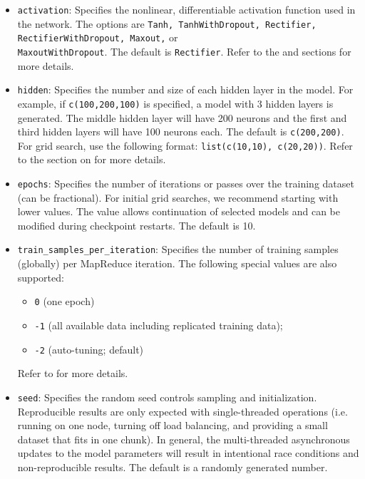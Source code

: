 {{{\begin{itemize}
\item \texttt{activation}: Specifies the nonlinear, differentiable activation function used in the network. The options are \texttt{Tanh, TanhWithDropout, Rectifier, RectifierWithDropout, Maxout,} or \\\texttt{MaxoutWithDropout}. The default is \texttt{Rectifier}. Refer to the {\textbf{}} and {\textbf{}} sections for more details.

\item \texttt{hidden}: Specifies the number and size of each hidden layer in the model. For example, if \texttt{c(100,200,100)} is specified, a model with 3 hidden layers is generated. The middle hidden layer will have 200 neurons and the first and third hidden layers will have 100 neurons each. The default is \texttt{c(200,200)}. For grid search, use the following format: \texttt{list(c(10,10), c(20,20))}. Refer to the section on  {\textbf{}} for more details. 

\item \texttt{epochs}: Specifies the number of iterations or passes over the training dataset (can be fractional). For initial grid searches, we recommend starting with lower values. The value allows continuation of selected models and can be modified during checkpoint restarts. The default is 10.

\item \texttt{train\_samples\_per\_iteration}: Specifies the number of training samples (globally) per MapReduce iteration. The following special values are also supported: 
\begin{itemize}
\item \texttt{0} (one epoch)
\item \texttt{-1} (all available data including replicated training data);
\item \texttt{-2} (auto-tuning; default)
\end{itemize}
Refer to {\textbf{}} for more details.

\item \texttt{seed}: Specifies the random seed controls sampling and initialization. Reproducible results are only expected with single-threaded operations (i.e. running on one node, turning off load balancing, and providing a small dataset that fits in one chunk).  In general, the multi-threaded asynchronous updates to the model parameters will result in intentional race conditions and non-reproducible results.  The default is a randomly generated number.


\end{itemize}}}}
